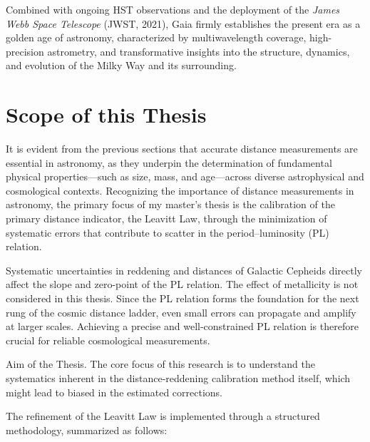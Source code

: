 Combined with ongoing HST observations and the deployment of the \emph{James Webb Space Telescope} (JWST, 2021), Gaia firmly establishes the present era as a golden age of astronomy, characterized by multiwavelength coverage, high-precision astrometry, and transformative insights into the structure, dynamics, and evolution of the Milky Way and its surrounding.

\section{Scope of this Thesis}

It is evident from the previous sections that accurate distance measurements are essential in astronomy, as they underpin the determination of fundamental physical properties—such as size, mass, and age—across diverse astrophysical and cosmological contexts. Recognizing the importance of distance measurements in astronomy, the primary focus of my master’s thesis is the calibration of the primary distance indicator, the Leavitt Law, through the minimization of systematic errors that contribute to scatter in the period–luminosity (PL) relation.

Systematic uncertainties in reddening and distances of Galactic Cepheids directly affect the slope and zero-point of the PL relation. The effect of metallicity is not considered in this thesis. Since the PL relation forms the foundation for the next rung of the cosmic distance ladder, even small errors can propagate and amplify at larger scales. Achieving a precise and well-constrained PL relation is therefore crucial for reliable cosmological measurements. 

\begin{notebox}[sharp corners, width=\textwidth]{Aim of the Thesis.}
The core focus of this research is to understand the systematics inherent in the distance-reddening calibration method \citep{2017madore} itself, which might lead to biased in the estimated corrections. 
\end{notebox}

The refinement of the Leavitt Law is implemented through a structured methodology, summarized as follows:

